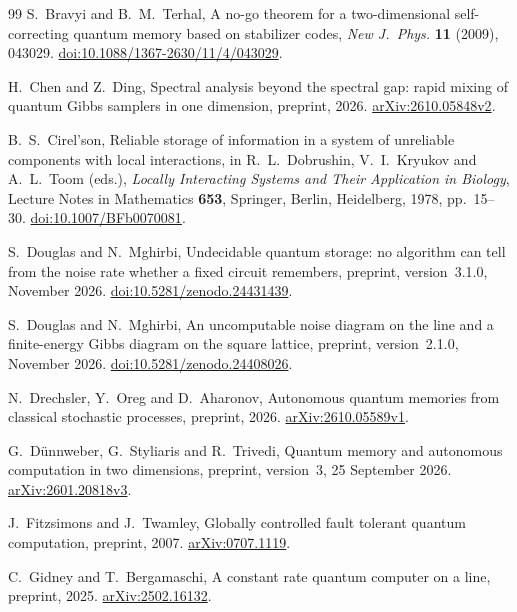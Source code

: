 \begin{thebibliography}{99}
S.~Bravyi and B.~M.~Terhal,
A no-go theorem for a two-dimensional self-correcting quantum memory based on stabilizer codes,
\emph{New J.~Phys.} \textbf{11} (2009), 043029.
\href{https://doi.org/10.1088/1367-2630/11/4/043029}{doi:10.1088/1367-2630/11/4/043029}.

H.~Chen and Z.~Ding,
Spectral analysis beyond the spectral gap: rapid mixing of quantum
Gibbs samplers in one dimension,
preprint, 2026.
\href{https://arxiv.org/abs/2610.05848v2}{arXiv:2610.05848v2}.

B.~S.~Cirel'son,
Reliable storage of information in a system of unreliable components
with local interactions,
in R.~L.~Dobrushin, V.~I.~Kryukov and A.~L.~Toom (eds.),
\emph{Locally Interacting Systems and Their Application in Biology},
Lecture Notes in Mathematics \textbf{653},
Springer, Berlin, Heidelberg, 1978, pp.~15--30.
\href{https://doi.org/10.1007/BFb0070081}{doi:10.1007/BFb0070081}.

S.~Douglas and N.~Mghirbi,
Undecidable quantum storage: no algorithm can tell from the noise rate whether a fixed circuit remembers,
preprint, version~3.1.0, November 2026.
\href{https://doi.org/10.5281/zenodo.24431439}{doi:10.5281/zenodo.24431439}.

S.~Douglas and N.~Mghirbi,
An uncomputable noise diagram on the line and a finite-energy Gibbs diagram on the square lattice,
preprint, version~2.1.0, November 2026.
\href{https://doi.org/10.5281/zenodo.24408026}{doi:10.5281/zenodo.24408026}.

N.~Drechsler, Y.~Oreg and D.~Aharonov,
Autonomous quantum memories from classical stochastic processes,
preprint, 2026.
\href{https://arxiv.org/abs/2610.05589v1}{arXiv:2610.05589v1}.

G.~D\"unnweber, G.~Styliaris and R.~Trivedi,
Quantum memory and autonomous computation in two dimensions,
preprint, version~3, 25 September 2026.
\href{https://arxiv.org/abs/2601.20818v3}{arXiv:2601.20818v3}.

J.~Fitzsimons and J.~Twamley,
Globally controlled fault tolerant quantum computation,
preprint, 2007.
\href{https://arxiv.org/abs/0707.1119}{arXiv:0707.1119}.

C.~Gidney and T.~Bergamaschi,
A constant rate quantum computer on a line,
preprint, 2025.
\href{https://arxiv.org/abs/2502.16132}{arXiv:2502.16132}.


\end{thebibliography}
